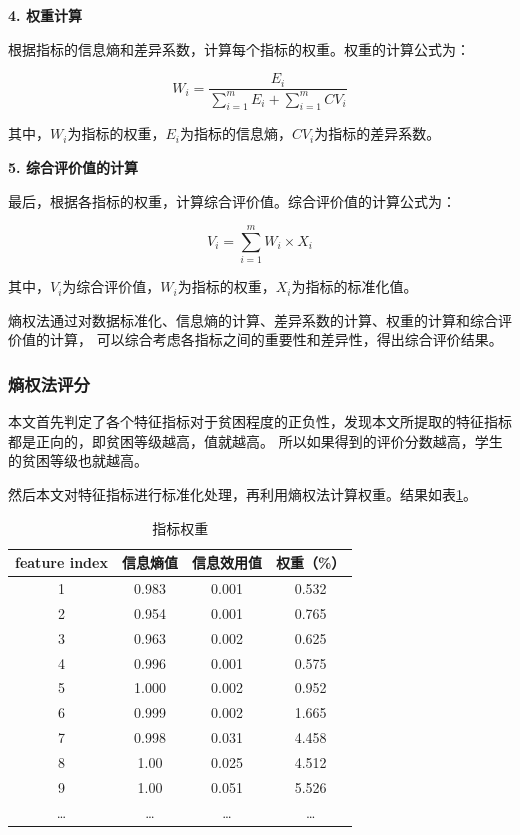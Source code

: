 \documentclass{article}
\begin{document}
\textbf{4. 权重计算}

根据指标的信息熵和差异系数，计算每个指标的权重。权重的计算公式为：

\[
W_i = \frac{{E_i}}{{\sum_{i=1}^{m} E_i + \sum_{i=1}^{m} CV_i}}
\]

其中，\(W_i\)为指标的权重，\(E_i\)为指标的信息熵，\(CV_i\)为指标的差异系数。

\textbf{5. 综合评价值的计算}

最后，根据各指标的权重，计算综合评价值。综合评价值的计算公式为：

\[
V_i = \sum_{i=1}^{m} W_i \times X_i
\]

其中，\(V_i\)为综合评价值，\(W_i\)为指标的权重，\(X_i\)为指标的标准化值。

熵权法通过对数据标准化、信息熵的计算、差异系数的计算、权重的计算和综合评价值的计算，
可以综合考虑各指标之间的重要性和差异性，得出综合评价结果。

\subsubsection{熵权法评分}

本文首先判定了各个特征指标对于贫困程度的正负性，发现本文所提取的特征指标都是正向的，即贫困等级越高，值就越高。
所以如果得到的评价分数越高，学生的贫困等级也就越高。

然后本文对特征指标进行标准化处理，再利用熵权法计算权重。结果如表\ref{weights}。

\begin{table}[htbp]
  \centering
  \caption{指标权重}
  \label{weights}
  \begin{tabular}{cccc}
    \toprule
    feature index  & 信息熵值 & 信息效用值 & 权重（\%） \\
    \midrule
    1         & 0.983     & 0.001  & 0.532 \\
    2         & 0.954     & 0.001  & 0.765 \\
    3         & 0.963     & 0.002  & 0.625 \\
    4         & 0.996     & 0.001  & 0.575 \\
    5         & 1.000     & 0.002  & 0.952 \\
    6         & 0.999     & 0.002  & 1.665 \\
    7         & 0.998     & 0.031  & 4.458 \\
    8         & 1.00      & 0.025  & 4.512 \\
    9         & 1.00      & 0.051  & 5.526 \\
    \dots     & \dots     & \dots  & \dots \\
    \bottomrule
  \end{tabular}
\end{table}
\end{document}
